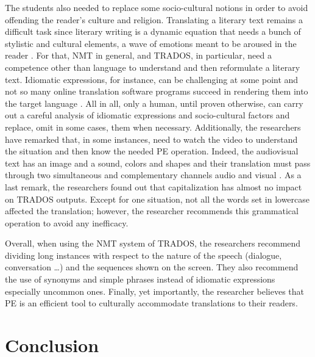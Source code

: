 \documentclass[english]{textolivre}
\begin{document}
The students also needed to replace some socio-cultural notions in order to avoid offending the reader’s culture and religion. Translating a literary text remains a difficult task since literary writing is a dynamic equation that needs a bunch of stylistic and cultural elements, a wave of emotions meant to be aroused in the reader \cite{zemni2022transfert}. For that, NMT in general, and TRADOS, in particular, need a competence other than language to understand and then reformulate a literary text. Idiomatic expressions, for instance, can be challenging at some point and not so many online translation software programs succeed in rendering them into the target language \cite[p. 2]{zemni2020audiovisual}. All in all, only a human, until proven otherwise, can carry out a careful analysis of idiomatic expressions and socio-cultural factors and replace, omit in some cases, them when necessary. Additionally, the researchers have remarked that, in some instances, need to watch the video to understand the situation and then know the needed PE operation. Indeed, the audiovisual text has an image and a sound, colors and shapes and their translation must pass through two simultaneous and complementary channels audio and visual \cite{karkabou_childrens_2019}. As a last remark, the researchers found out that capitalization has almost no impact on TRADOS outputs. Except for one situation, not all the words set in lowercase affected the translation; however, the researcher recommends this grammatical operation to avoid any inefficacy.

Overall, when using the NMT system of TRADOS, the researchers recommend dividing long instances with respect to the nature of the speech (dialogue, conversation …) and the sequences shown on the screen. They also recommend the use of synonyms and simple phrases instead of idiomatic expressions especially uncommon ones. Finally, yet importantly, the researcher believes that PE is an efficient tool to culturally accommodate translations to their readers.

\section{Conclusion}
\end{document}
